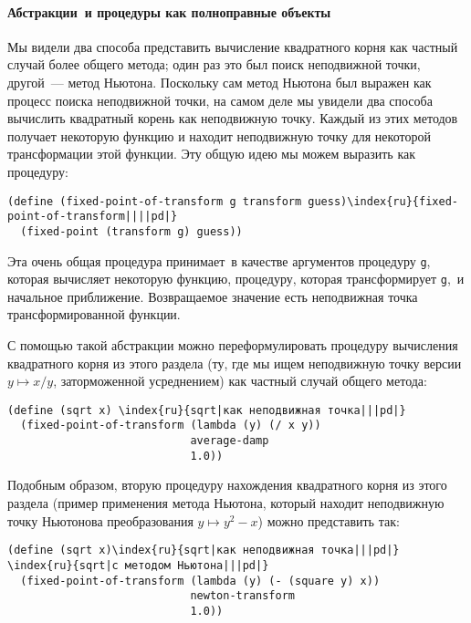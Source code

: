\paragraph{Абстракции~и процедуры как полноправные
объекты}


Мы видели два способа представить вычисление квадратного
корня как частный случай более общего \mbox{метода}; один раз это был поиск
неподвижной точки, другой~--- метод Ньютона.  Поскольку сам метод Ньютона
был выражен как процесс поиска неподвижной точки, на самом деле мы
увидели два способа вычислить квадратный корень как неподвижную точку.
Каждый из этих методов получает некоторую функцию и
находит
неподвижную точку для некоторой трансформации этой функции. Эту общую идею 
мы можем выразить как процедуру:

\begin{Verbatim}[fontsize=\small]
(define (fixed-point-of-transform g transform guess)\index{ru}{fixed-point-of-transform||||pd|}
  (fixed-point (transform g) guess))
\end{Verbatim}
Эта очень общая процедура принимает~в качестве аргументов процедуру
{\tt g}, которая вычисляет некоторую функцию, процедуру,
которая трансформирует {\tt g},~и начальное приближение.
Возвращаемое значение есть неподвижная точка трансформированной
функции.

С помощью такой абстракции можно
переформулировать 
процедуру вычисления квадратного корня из этого раздела (ту, где мы
ищем неподвижную точку версии $y \mapsto x / y$,
заторможенной усреднением) как частный случай общего метода:

\begin{Verbatim}[fontsize=\small]
(define (sqrt x) \index{ru}{sqrt|как неподвижная точка|||pd|}
  (fixed-point-of-transform (lambda (y) (/ x y))
                            average-damp
                            1.0))
\end{Verbatim}
Подобным образом, вторую процедуру нахождения 
квадратного корня из этого раздела (пример применения метода
Ньютона, который находит неподвижную точку Ньютонова преобразования
$y \mapsto y^2 - x$) можно представить так:

\begin{Verbatim}[fontsize=\small]
(define (sqrt x)\index{ru}{sqrt|как неподвижная точка|||pd|} \index{ru}{sqrt|с методом Ньютона|||pd|}
  (fixed-point-of-transform (lambda (y) (- (square y) x))
                            newton-transform
                            1.0))
\end{Verbatim}

